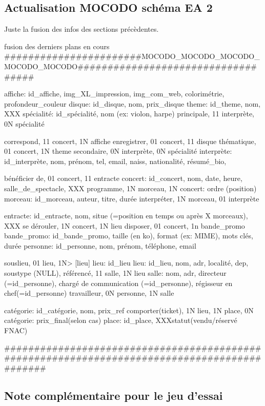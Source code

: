 \documentclass[12pt,a4paper]{article}
\begin{document}
{\subsection{Actualisation MOCODO schéma EA 2}
Juste la fusion des infos des sections précèdentes.

fusion des derniers plans en cours
#######################MOCODO_MOCODO_MOCODO_MOCODO_MOCODO###################################

affiche: id_affiche, img_XL_impression, img_com_web, colorimétrie, profondeur_couleur
disque: id_disque, nom, prix_disque
theme: id_theme, nom, XXX
spécialité: id_spécialité, nom (ex: violon, harpe)
principale, 11 interprète, 0N spécialité

correspond, 11 concert, 1N affiche
enregistrer, 01 concert, 11 disque
thématique, 01 concert, 1N theme
secondaire, 0N interprète, 0N spécialité
interprète: id_interprète, nom, prénom, tel, email, naiss, nationalité, résumé_bio,

bénéficier de, 01 concert, 11 entracte
concert: id_concert, nom, date, heure, salle_de_spectacle, XXX
programme, 1N morceau, 1N concert: ordre (position)
morceau: id_morceau, auteur, titre, durée
interpréter, 1N morceau, 01 interprète

entracte: id_entracte, nom, situe (=position en temps ou après X morceaux), XXX
se dérouler, 1N concert, 1N lieu
disposer, 01 concert, 1n bande_promo
bande_promo: id_bande_promo, taille (en ko), format (ex: MIME), mots clés, durée
personne: id_personne, nom, prénom, téléphone, email

souslieu, 01 lieu,   1N> [lieu] lieu: id_lieu
lieu: id_lieu, nom, adr, localité, dep, soustype (NULL),
référencé, 11 salle, 1N lieu
salle: nom, adr, directeur (=id_personne), chargé de communication (=id_personne), régisseur en chef(=id_personne)
travailleur, 0N personne, 1N salle

catégorie: id_catégorie, nom, prix_ref
comporter(ticket), 1N lieu, 1N place, 0N catégorie: prix_final(selon cas)
place: id_place, XXXstatut(vendu/réservé FNAC)

#############################################################################################







\subsection{Note complémentaire pour le jeu d'essai}


}
\end{document}
